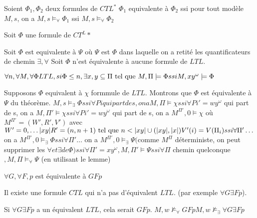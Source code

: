 \documentclass[10pt,a4paper]{article}
\begin{document}
\begin{definition}
 Soient $\Phi_1, \Phi_2$ deux formules de $CTL^*$
$\Phi_1$ equivalente à $\Phi_2$ ssi pour tout modèle $M,s$, on a 
	    $M,s \models_\forall \Phi_1$ ssi $M,s \models_\forall \Phi_2$

\end{definition}

\begin{thm}
 Soit $\Phi$ une formule de $CT^L*$
 
Soit $\Phi$ est equivalente à $\Psi$ où $\Psi$ est $\Phi$ dans laquelle on a retité les quantificateurs de chemin $\exists, \forall$
Soit $\Phi$ n'est équivalente à aucune formule de $LTL$.
\end{thm}

\begin{lem}
$\forall n, \forall M,
 \forall \Phi LTL, si \Phi \leq n, \exists x, y \subseteq \Pi \text{ tel que }
M, \Pi \models \Phi ssi M, xy^\omega \models \Phi$
\end{lem}

\begin{dem}[du théorème]
 Supposons $\Phi$ equivalent à $\chi$ formmule de $LTL$.
 Montrons que $\Phi$ est équivalente à $\Psi$ du théorème.
 $M,s \models_\exists \Phi ssi \forall Pi qui part de s, on a M, \Pi \models \chi
		       ssi \forall Pi' = wy^{\omega}$ qui part de s, on a $M, \Pi' \models \chi
		       ssi \forall Pi' = wy^{\omega}$ qui part de s, on a $M^{\Pi'}, 0 \models \chi
		      $ où $M^{\Pi'} = (W', R', V')$ avec $W' = {0, \dots |xy|}
						    R' = {(n, n+1) \text{ tel que } n < |xy|} \cup {(|xy|, |x|)}
						    V'(i) = V(\Pi_i)
		       ssi \forall \Pi' \dots$ on a $M^{\Pi'}, 0 \models_\exists \Phi
		       ssi \forall \Pi' \dots$ on a $M^{\Pi'}, 0 \models_\exists \Psi ($comme $M^\Pi$ déterministe, on peut supprimer les $\forall et \exists de \Phi)
		       ssi \forall \Pi' = x y ^{\omega}, M, \Pi' \models \Psi
		       ssi \forall \Pi$ chemin quelconque$, M, \Pi \models_\forall \Psi$ (en utilisant le lemme)
\end{dem}

\begin{ex}
 $\forall G, \forall F, p$ est équivalente à $G F p $
\end{ex}

\begin{thm}
 Il existe une formule $CTL$ qui n'a pas d'équivalent $LTL$.
(par exemple $\forall G  \exists F p$).
\end{thm}

\begin{dem}
 Si $\forall G \exists F p$ a un équivalent $LTL$, cela serait $G F p$.
$M, w \not \models_\forall G F p
M, w \not \models_\exists \forall G \exists F p$
\end{dem}
\end{document}

